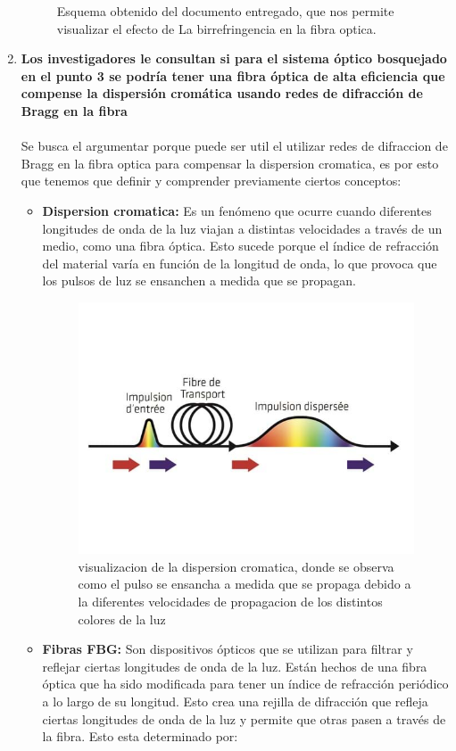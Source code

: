 \begin{enumerate}
\begin{figure}
	\caption{Esquema obtenido del documento entregado, que nos permite visualizar el efecto de La birrefringencia en la fibra optica.}
	\label{fig:figures}
	\end{figure}
\item \textbf{Los investigadores le consultan si para el sistema óptico bosquejado en el punto
3 se podría tener una fibra óptica de alta eficiencia que compense la dispersión cromática
usando redes de difracción de Bragg en la fibra}\\\\
Se busca el argumentar porque puede ser util el utilizar redes de difraccion de Bragg en la fibra optica para compensar la dispersion cromatica, es por esto que tenemos que definir y comprender previamente ciertos conceptos:
\begin{itemize}
	\item \textbf{Dispersion cromatica:} Es un fenómeno que ocurre cuando diferentes longitudes de onda de la luz viajan a distintas velocidades a través de un medio, como una fibra óptica. Esto sucede porque el índice de refracción del material varía en función de la longitud de onda, lo que provoca que los pulsos de luz se ensanchen a medida que se propagan.
	\begin{figure}
		\centering
		\includegraphics[width=0.5\linewidth]{img/P6_1.jpg}
		\caption{visualizacion de la dispersion cromatica, donde se observa como el pulso se ensancha a medida que se propaga debido a la diferentes velocidades de propagacion de los distintos colores de la luz}
		\label{fig:imagen1}
	\end{figure}
	\item \textbf{Fibras FBG:} Son dispositivos ópticos que se utilizan para filtrar y reflejar ciertas longitudes de onda de la luz. Están hechos de una fibra óptica que ha sido modificada para tener un índice de refracción periódico a lo largo de su longitud. Esto crea una rejilla de difracción que refleja ciertas longitudes de onda de la luz y permite que otras pasen a través de la fibra. Esto esta determinado por:

\end{itemize}
\end{enumerate}
